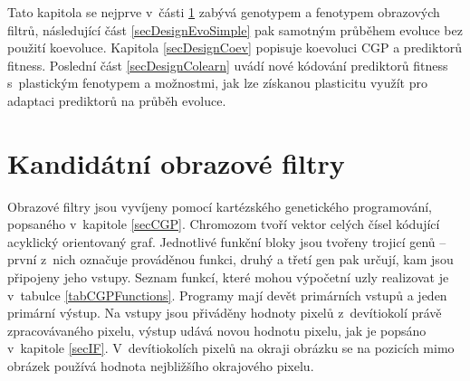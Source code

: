 Tato kapitola se nejprve v~části \ref{secDesignIF} zabývá genotypem a fenotypem obrazových filtrů, následující část \ref{secDesignEvoSimple} pak samotným průběhem evoluce bez použití koevoluce. Kapitola \ref{secDesignCoev} popisuje koevoluci CGP a prediktorů fitness. Poslední část \ref{secDesignColearn} uvádí nové kódování prediktorů fitness s~plastickým fenotypem a možnostmi, jak lze získanou plasticitu využít pro adaptaci prediktorů na průběh evoluce.

\section{Kandidátní obrazové filtry}
\label{secDesignIF}

Obrazové filtry jsou vyvíjeny pomocí kartézského genetického programování, popsaného v~kapitole \ref{secCGP}. Chromozom tvoří vektor celých čísel kódující acyklický orientovaný graf. Jednotlivé funkční bloky jsou tvořeny trojicí genů -- první z~nich označuje prováděnou funkci, druhý a třetí gen pak určují, kam jsou připojeny jeho vstupy. Seznam funkcí, které mohou výpočetní uzly realizovat je v~tabulce \ref{tabCGPFunctions}. Programy mají devět primárních vstupů a jeden primární výstup. Na vstupy jsou přiváděny hodnoty pixelů z~devítiokolí právě zpracovávaného pixelu, výstup udává novou hodnotu pixelu, jak je popsáno v~kapitole \ref{secIF}. V~devítiokolích pixelů na okraji obrázku se na pozicích mimo obrázek používá hodnota nejbližšího okrajového pixelu.

